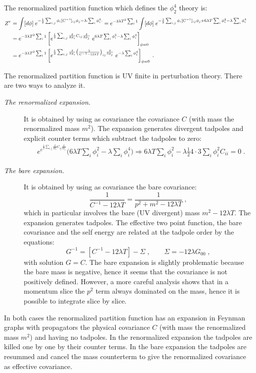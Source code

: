 \documentclass[10pt]{article}
\theoremstyle{plain}
\theoremstyle{definition}
\begin{document}
The renormalized partition function which defines the $\phi^4_2$ theory is:
\begin{align*}
 Z^r & = \int [d\phi] \; e^{-\frac{1}{2} \sum_{i,j} \phi_i [C^{-1}]_{ij} \phi_j -\lambda : \sum_i \phi_i^4 : }  
 = e^{-3\lambda T^2 \sum_i 1 } \int [d\phi] \; e^{-\frac{1}{2} \sum_{i,j} \phi_i[C^{-1} ]_{ij} \phi_j + 6 \lambda T \sum_i \phi_i^2  -\lambda   \sum_i \phi_i^4   } \crcr
  & = e^{-3\lambda T^2 \sum_i 1 } \left[  e^{ \frac{1}{2} \sum_{i,j} \frac{\delta}{\delta \phi_i}  C_{ij}  \frac{\delta}{\delta \phi_j} }  \;e^{ 6 \lambda T \sum_i \phi_i^2-\lambda \sum_i \phi_i^4} \right]_{\phi=0}
  \crcr
  & =  e^{-3\lambda T^2 \sum_i 1 }
  \left[  e^{ \frac{1}{2} \sum_{i,j} \frac{\delta}{\delta \phi_i}  \left( \frac{1}{C^{-1} -  12\lambda T  } \right)_{ij}  \frac{\delta}{\delta \phi_j} }  \;e^{-\lambda \sum_i \phi_i^4} \right]_{\phi=0} \;.
\end{align*}

The renormalized partition function is UV finite in perturbation theory. There are two ways to analyze it.
\begin{description}
 \item[\it The renormalized expansion.] It is obtained by using as covariance the covariance $C$ (with mass the renormalized mass $m^2$). The expansion generates divergent tadpoles and explicit counter terms which subtract the tadpoles to zero: 
    \begin{align*}
      &  
       e^{   e^{ \frac{1}{2} \sum_{i,j} \frac{\delta}{\delta \phi_i}  C_{ij}  \frac{\delta}{\delta \phi_j} }  }  
       \bigg( 6 \lambda T  \sum_i \phi_i^2 -\lambda \sum_i \phi_i^4  \bigg)   \Rightarrow  6 \lambda T \sum_i \phi_i^2 -\lambda \frac{1}{2} 4\cdot 3 \sum_i \phi_i^2 C_{ii} =0 \;.
    \end{align*} 

\item[\it The bare expansion.] It is obtained by using as covariance the bare covariance:
\[ \frac{1}{C^{-1} -  12\lambda T  }   = \frac{1}{ p^2 + m^2 -12\lambda T  } \;,\]
which in particular involves the bare (UV divergent) mass $m^2 -12\lambda T  $. The expansion generates tadpoles. 
The effective two point function, the bare covariance and the self energy are related at the tadpole order by the equations: 
\[
 G^{-1} =  [ C^{-1} -  12\lambda T  ] -\Sigma \;, \qquad \Sigma = - 12 \lambda G_{00} \;,
\]
with solution $G = C$. 
The bare expansion is slightly problematic because the bare mass is negative, hence it seems that the covariance is not positively defined. However, a more careful analysis shows that in a momentum slice the 
$p^2$ term always dominated on the mass, hence it is possible to integrate slice by slice.
\end{description}

In both cases the renormalized partition function has an expansion in Feynman graphs with propagators the physical covariance $C$ (with mass the  renormalized mass $m^2$)
and  having no tadpoles.
In the renormalized expansion the tadpoles are killed one  by one by their counter terms. In the bare expansion the tadpoles are resummed and cancel the mass counterterm to give the renormalized covariance as effective covariance.

 


 
 
\end{document}

